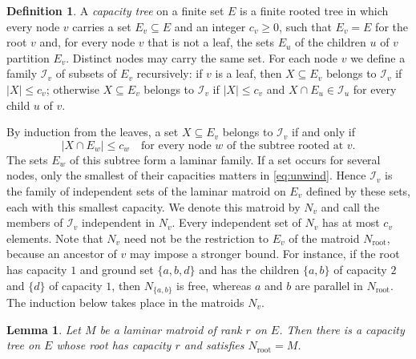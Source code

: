\documentclass[11pt]{amsart}
\newtheorem{lemma}[theorem]{Lemma}
\theoremstyle{definition}
\newtheorem{definition}[theorem]{Definition}
\theoremstyle{remark}
\numberwithin{equation}{section}
\newcommand{\I}{\mathcal{I}}
\begin{document}
\begin{definition}\label{def:tree}
A \emph{capacity tree} on a finite set $E$ is a finite rooted tree in which every node $v$ carries a set $E_v\subseteq E$ and an integer $c_v\ge 0$, such that $E_v=E$ for the root $v$ and, for every node $v$ that is not a leaf, the sets $E_u$ of the children $u$ of $v$ partition $E_v$. Distinct nodes may carry the same set. For each node $v$ we define a family $\I_v$ of subsets of $E_v$ recursively: if $v$ is a leaf, then $X\subseteq E_v$ belongs to $\I_v$ if $|X|\le c_v$; otherwise $X\subseteq E_v$ belongs to $\I_v$ if $|X|\le c_v$ and $X\cap E_u\in\I_u$ for every child $u$ of $v$.
\end{definition}

By induction from the leaves, a set $X\subseteq E_v$ belongs to $\I_v$ if and only if
\begin{equation}\label{eq:unwind}
|X\cap E_w|\le c_w \quad\text{for every node $w$ of the subtree rooted at $v$.}
\end{equation}
The sets $E_w$ of this subtree form a laminar family. If a set occurs for several nodes, only the smallest of their capacities matters in \eqref{eq:unwind}. Hence $\I_v$ is the family of independent sets of the laminar matroid on $E_v$ defined by these sets, each with this smallest capacity. We denote this matroid by $N_v$ and call the members of $\I_v$ independent in $N_v$. Every independent set of $N_v$ has at most $c_v$ elements. Note that $N_v$ need not be the restriction to $E_v$ of the matroid $N_{\mathrm{root}}$, because an ancestor of $v$ may impose a stronger bound. For instance, if the root has capacity $1$ and ground set $\{a,b,d\}$ and has the children $\{a,b\}$ of capacity $2$ and $\{d\}$ of capacity $1$, then $N_{\{a,b\}}$ is free, whereas $a$ and $b$ are parallel in $N_{\mathrm{root}}$. The induction below takes place in the matroids $N_v$.

\begin{lemma}\label{lem:tree}
Let $M$ be a laminar matroid of rank $r$ on $E$. Then there is a capacity tree on $E$ whose root has capacity $r$ and satisfies $N_{\mathrm{root}}=M$.
\end{lemma}
\end{document}
